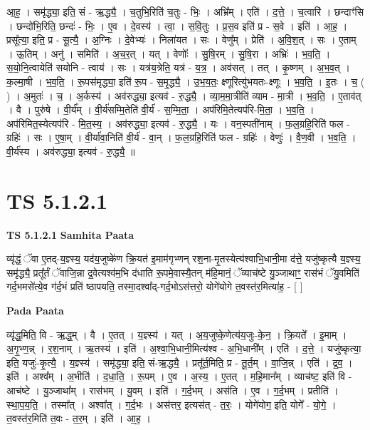 \documentclass[17pt]{extarticle}
\begin{document}
आ॒ह॒ । समृ॑द्ध्या॒ इति॒ सं - ऋ॒द्ध्यै॒ । च॒तुभि॒रिति॑ च॒तुः - भिः॒ । अभ्रि᳚म् । एति॑ । द॒त्ते॒ । च॒त्वारि॑ । छन्दाꣳ॑सि । छन्दो॑भि॒रिति॒ छन्दः॑ - भिः॒ । ए॒व । दे॒वस्य॑ । त्वा॒ । स॒वि॒तुः । प्र॒स॒व इति॑ प्र - स॒वे । इति॑ । आ॒ह॒ । प्रसू᳚त्या॒ इति॒ प्र - सू॒त्यै॒ । अ॒ग्निः । दे॒वेभ्यः॑ । निला॑यत । सः । वेणु᳚म् । प्रेति॑ । अ॒वि॒श॒त् । सः । ए॒ताम् । ऊ॒तिम् । अनु॑ । समिति॑ । अ॒च॒र॒त् । यत् । वेणोः᳚ । सु॒षि॒रम् । सु॒षि॒रा । अभ्रिः॑ । भ॒व॒ति॒ । स॒यो॒नि॒त्वायेति॑ सयोनि - त्वाय॑ । सः । यत्र॑य॒त्रेति॒ यत्र॑ - य॒त्र॒ । अव॑सत् । तत् । कृ॒ष्णम् । अ॒भ॒व॒त् । क॒ल्मा॒षी । भ॒व॒ति॒ । रू॒पस॑मृद्ध्या॒ इति॑ रू॒प - स॒मृ॒द्ध्यै॒ । उ॒भ॒य॒तः॒ क्ष्णूरित्यु॑भयतः-क्ष्णूः । भ॒व॒ति॒ । इ॒तः । च॒ ( ) । अ॒मुतः॑ । च॒ । अ॒र्कस्य॑ । अव॑रुद्ध्या॒ इत्यव॑ - रु॒द्ध्यै॒ । व्या॒म॒मा॒त्रीति॑ व्याम - मा॒त्री । भ॒व॒ति॒ । ए॒ताव॑त् । वै । पुरु॑षे । वी॒र्य᳚म् । वी॒र्य॑सम्मि॒तेति॑ वी॒र्य॑ - स॒म्मि॒ता॒ । अप॑रिमि॒तेत्यप॑रि-मि॒ता॒ । भ॒व॒ति॒ । अप॑रिमित॒स्येत्यप॑रि - मि॒त॒स्य॒ । अव॑रुद्ध्या॒ इत्यव॑ - रु॒द्ध्यै॒ । यः । वन॒स्पती॑नाम् । फ॒ल॒ग्रहि॒रिति॑ फल - ग्रहिः॑ । सः । ए॒षा॒म् । वी॒र्या॑वा॒निति॑ वी॒र्य॑ - वा॒न् । फ॒ल॒ग्रहि॒रिति॑ फल - ग्रहिः॑ । वेणुः॑ । वै॒ण॒वी । भ॒व॒ति॒ । वी॒र्य॑स्य । अव॑रुद्ध्या॒ इत्यव॑ - रु॒द्ध्यै॒ ॥  \newline





\section{ TS 5.1.2.1 }

\textbf{TS 5.1.2.1 } \newline
\textbf{Samhita Paata} \newline

व्यृ॑द्धं॒ ॅवा ए॒तद्-य॒ज्ञ्स्य॒ यद॑य॒जुष्के॑ण क्रि॒यत॑ इ॒माम॑गृभ्णन् रश॒ना-मृ॒तस्येत्य॑श्वाभि॒धानी॒मा द॑त्ते॒ यजु॑ष्कृत्यै य॒ज्ञ्स्य॒ समृ॑द्ध्यै॒ प्रतू᳚र्तं ॅवाजि॒न्ना द्र॒वेत्यश्व॑म॒भि द॑धाति रू॒पमे॒वास्यै॒तन् म॑हि॒मानं॒ ॅव्याच॑ष्टे यु॒ञ्जाथाꣳ॒॒ रास॑भं ॅयु॒वमिति॑ गर्द॒भमसे॑त्ये॒व ग॑र्द॒भं प्रति॑ ष्ठापयति॒ तस्मा॒दश्वा᳚द्-गर्द॒भोऽस॑त्तरो॒ योगे॑योगे त॒वस्त॑र॒मित्या॑ह॒ - [  ] \newline

\textbf{Pada Paata} \newline

व्यृ॑द्ध॒मिति॒ वि - ऋ॒द्ध॒म् । वै । ए॒तत् । य॒ज्ञ्स्य॑ । यत् । अ॒य॒जुष्के॒णेत्य॑य॒जुः-के॒न॒ । क्रि॒यते᳚ । इ॒माम् । अ॒गृ॒भ्ण॒न्न् । र॒श॒नाम् । ऋ॒तस्य॑ । इति॑ । अ॒श्वा॒भि॒धानी॒मित्य॑श्व - अ॒भि॒धानी᳚म् । एति॑ । द॒त्ते॒ । यजु॑ष्कृत्या॒ इति॒ यजुः॑-कृ॒त्यै॒ । य॒ज्ञ्स्य॑ । समृ॑द्ध्या॒ इति॒ सं-ऋ॒द्ध्यै॒ । प्रतू᳚र्त॒मिति॒ प्र - तू॒र्त॒म् । वा॒जि॒न्न् । एति॑ । द्र॒व॒ । इति॑ । अश्व᳚म् । अ॒भीति॑ । द॒धा॒ति॒ । रू॒पम् । ए॒व । अ॒स्य॒ । ए॒तत् । म॒हि॒मान᳚म् । व्याच॑ष्ट॒ इति॑ वि - आच॑ष्टे । यु॒ञ्जाथा᳚म् । रास॑भम् । यु॒वम् । इति॑ । ग॒र्द॒भम् । अस॑ति । ए॒व । ग॒र्द॒भम् । प्रतीति॑ । स्था॒प॒य॒ति॒ । तस्मा᳚त् । अश्वा᳚त् । ग॒र्द॒भः । अस॑त्तर॒ इत्यस॑त् - त॒रः॒ । योगे॑योग॒ इति॒ योगे᳚ - यो॒गे॒ । त॒वस्त॑र॒मिति॑ त॒वः - त॒र॒म् । इति॑ । आ॒ह॒ ।  \newline
\end{document}
